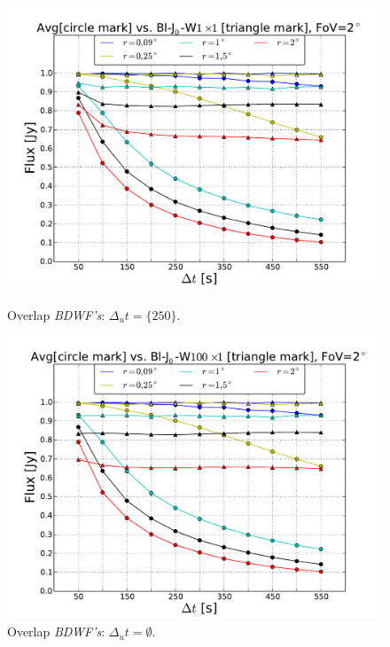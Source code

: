 \documentclass[useAMS,usenatbib]{mn2e}
\begin{document}
\begin{figure}
\begin{minipage}{0.45\linewidth}\includegraphics[width=1\textwidth]{./Figures/max-integ-time-bessel-w1x1fov2.pdf}\caption{Overlap 
		\textit{BDWF's}: $\Delta_u t=\{250\}$.}\label{fig:fig_4}\end{minipage}
\begin{minipage}{0.45\linewidth}\includegraphics[width=1\textwidth]{./Figures/max-integ-time-bessel-w100x1fov2.pdf}\caption{Overlap 
		\textit{BDWF's}: $\Delta_u t=\emptyset$.}\label{fig:fig_5}\end{minipage}
\end{figure}
\end{document}
